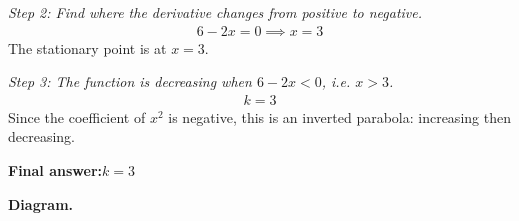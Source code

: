 \documentclass[11pt]{article}
\begin{document}
\textit{Step 2: Find where the derivative changes from positive to negative.}
\[\begin{gathered}
6 - 2x = 0 \implies x = 3
\end{gathered}\]
The stationary point is at \( x = 3 \).

\textit{Step 3: The function is decreasing when \( 6 - 2x < 0 \), i.e. \( x > 3 \).}
\[\begin{gathered}
k = 3
\end{gathered}\]
Since the coefficient of \( x^2 \) is negative, this is an inverted parabola: increasing then decreasing.

\begin{answerbox}
\textbf{Final answer:}\quad \(\displaystyle  k = 3 \)
\end{answerbox}
\textbf{Diagram.}
\end{document}
